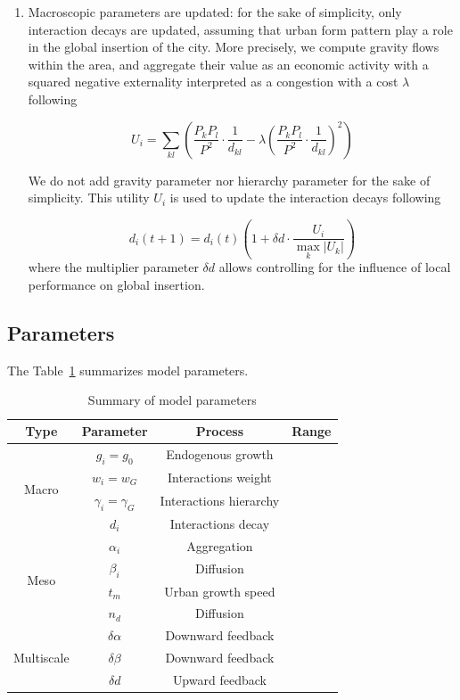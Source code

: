 \documentclass[11pt]{article}
\begin{document}
\begin{enumerate}
	\item Macroscopic parameters are updated: for the sake of simplicity, only interaction decays are updated, assuming that urban form pattern play a role in the global insertion of the city. More precisely, we compute gravity flows within the area, and aggregate their value as an economic activity with a squared negative externality interpreted as a congestion with a cost $\lambda$ following
	
	\begin{equation}
		U_i = \sum_{kl} \left( \frac{P_k P_l}{P^2} \cdot \frac{1}{d_{kl}} - \lambda \left(\frac{P_k P_l}{P^2} \cdot \frac{1}{d_{kl}}\right)^2 \right)
	\end{equation}
	
	We do not add gravity parameter nor hierarchy parameter for the sake of simplicity. This utility $U_i$ is used to update the interaction decays following
	
	\begin{equation}
		d_i (t+1) = d_i (t) \left( 1 + \delta d \cdot \frac{U_i}{\max_k \left|U_k\right|} \right)
	\end{equation}
	where the multiplier parameter $\delta d$ allows controlling for the influence of local performance on global insertion.
\end{enumerate}





\subsection{Parameters}

The Table~\ref{tab:parameters} summarizes model parameters.

\begin{table}
	\caption{Summary of model parameters\label{tab:parameters}}
	\centering
	\begin{tabular}{|c|c|c|c|}
	\hline
		Type & Parameter & Process & Range \\\hline
		\multirow{4}{*}{Macro} & $g_i = g_0$ & Endogenous growth & \\
		& $w_i = w_G$ & Interactions weight & \\
		& $\gamma_i = \gamma_G$ & Interactions hierarchy & \\
		& $d_i$ & Interactions decay & \\ \hline
		\multirow{4}{*}{Meso} & $\alpha_i$ & Aggregation & \\
		& $\beta_i$ & Diffusion & \\
		& $t_m$ & Urban growth speed & \\
		& $n_d$ & Diffusion & \\ \hline
		\multirow{3}{*}{Multiscale} & $\delta\alpha$ & Downward feedback & \\
		& $\delta\beta$ & Downward feedback & \\
		& $\delta d$ & Upward feedback & \\\hline
	\end{tabular}
\end{table}
\end{document}

